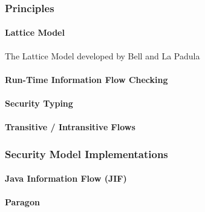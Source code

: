 \subsubsection{Principles}

	\paragraph{Lattice Model}
	
	The Lattice Model developed by Bell and La Padula \cite{bell1976lattice} 
	
	\cite{denning1976lattice}
	
	\cite{sandhu1994lattice}
	
	\paragraph{Run-Time Information Flow Checking}

	\paragraph{Security Typing}
	
	\paragraph{Transitive / Intransitive Flows}

\subsubsection{Security Model Implementations}

	\paragraph{Java Information Flow (JIF)}
	
	\paragraph{Paragon}